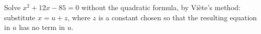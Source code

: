 Solve $x^2+12x-85=0$ without the quadratic formula, by Vi\`ete's method: substitute $x=u+z$, where $z$ is a constant chosen so that the resulting equation in $u$ has no term in $u$.
